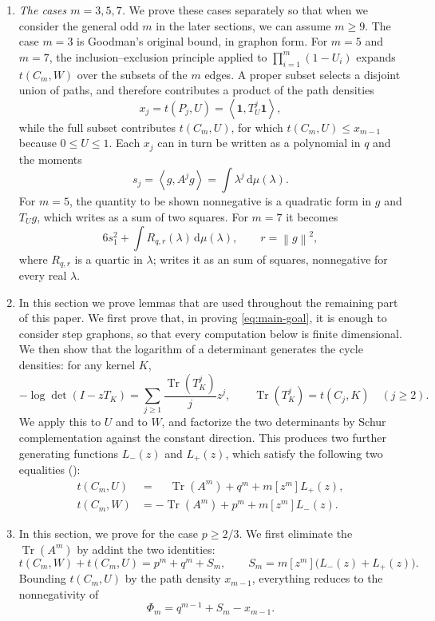 \documentclass[11pt]{article}
\numberwithin{equation}{section}
\newcommand{\one}{\mathbf 1}
\newcommand{\ip}[2]{\left\langle #1,#2\right\rangle}
\newcommand{\norm}[1]{\left\lVert #1\right\rVert}
\newcommand{\Tr}{\operatorname{Tr}}
\newcommand{\dd}{\,\mathrm d}
\begin{document}
\begin{enumerate}[label=\textbf{Section \arabic*.},leftmargin=4.6em,start=2]
  \item \emph{The cases $m=3,5,7$.}
  We prove these cases separately so that when we consider the general odd $m$ in the later sections, we can assume $m\ge9$.
  The case $m=3$ is Goodman's original bound, in graphon form.
  For $m=5$ and $m=7$, the inclusion--exclusion principle applied to $\prod_{i=1}^m(1-U_i)$ expands $t(C_m,W)$ over the subsets of the $m$ edges.
  A proper subset selects a disjoint union of paths, and therefore contributes a product of the path densities
  \[
    x_j=t(P_j,U)=\ip\one{T_U^j\one},
  \]
  while the full subset contributes $t(C_m,U)$, for which $t(C_m,U)\le x_{m-1}$ because $0\le U\le1$.
  Each $x_j$ can in turn be written as a polynomial in $q$ and the moments
  \[
    s_j=\ip g{A^jg}=\int\lambda^j\dd\mu(\lambda).
  \]
  For $m=5$, the quantity to be shown nonnegative is a quadratic form in $g$ and $T_Ug$, which  writes as a sum of two squares.
  For $m=7$ it becomes
  \[
    6s_1^2+\int R_{q,r}(\lambda)\dd\mu(\lambda),
    \qquad r=\norm g^2,
  \]
  where $R_{q,r}$ is a quartic in $\lambda$;  writes it as an sum of squares, nonnegative for every real $\lambda$.

  \item In this section we prove lemmas that are used throughout the remaining part of this paper.
  We first prove that, in proving \eqref{eq:main-goal}, it is enough to consider step graphons, so that every computation below is finite dimensional.
  We then show that the logarithm of a determinant generates the cycle densities: for any kernel $K$,
  \[
    -\log\det(I-zT_K)=\sum_{j\ge1}\frac{\Tr(T_K^j)}{j}z^j,
    \qquad
    \Tr(T_K^j)=t(C_j,K)\quad(j\ge2).
  \]
  We apply this to $U$ and to $W$, and factorize the two determinants by Schur complementation against the constant direction.
  This produces two further generating functions $L_-(z)$ and $L_+(z)$, which satisfy the following two equalities ():
  \begin{align*}
    t(C_m,U)&=\phantom{-}\Tr(A^m)+q^m+m[z^m]L_+(z),\\
    t(C_m,W)&=-\Tr(A^m)+p^m+m[z^m]L_-(z).
  \end{align*}
  \item In this section, we prove  for the case $p \ge 2/3$.
  We first eliminate the $\Tr(A^m)$ by addint the two identities:
  \[
    t(C_m,W)+t(C_m,U)=p^m+q^m+S_m,
    \qquad
    S_m=m[z^m]\bigl(L_-(z)+L_+(z)\bigr).
  \]
  Bounding $t(C_m,U)$ by the path density $x_{m-1}$, everything reduces to the nonnegativity of
  \[
    \Phi_m=q^{m-1}+S_m-x_{m-1}.
  \]


\end{enumerate}
\end{document}
